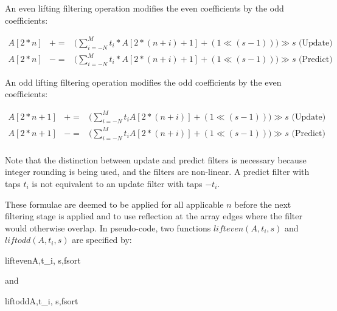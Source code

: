 An even lifting filtering operation modifies the even coefficients
by the odd coefficients:

\begin{eqnarray*}
  A[2*n]& +=& \big( \sum^M_{i=-N} t_i *A[2*(n+i) + 1] +(1\ll (s-1))\big) \gg s \mbox{ (Update)} \\
  A[2*n]& -=& \big( \sum^M_{i=-N} t_i *A[2*(n+i) + 1] +(1\ll (s-1))\big) \gg s \mbox{ (Predict)}
\end{eqnarray*}

An odd lifting filtering operation modifies the odd coefficients
 by the even coefficients:

\begin{eqnarray*}
  A[2*n+1]& +=&  \big( \sum^M_{i=-N} t_i A[2*(n+i)]+(1\ll (s-1)) \big) \gg s \mbox{ (Update)} \\
  A[2*n+1]& -=&  \big( \sum^M_{i=-N} t_i A[2*(n+i)] +(1\ll (s-1))\big) \gg s \mbox{ (Predict)} \\
\end{eqnarray*}

\begin{informative}
Note that the distinction between update and predict filters is necessary
because integer rounding is being used, and the filters are non-linear.
A predict filter with taps $t_i$ is not equivalent to an update filter with taps $-t_i$.
\end{informative}

These formulae are deemed to be applied for all applicable $n$
before the next filtering stage is applied and to use reflection at the array
edges where the filter would otherwise overlap. In pseudo-code, two
functions $lifteven(A, t_i, s)$ and $liftodd(A, t_i, s)$ are specified by:

\begin{pseudo}{lifteven}{A,t_i, s,fsort}
        \bsELSE
        \bsEND
    \bsEND
    \bsELSE
\bsEND
\end{pseudo}

and

\begin{pseudo}{liftodd}{A,t_i, s,fsort}
        \bsELSE
        \bsEND
    \bsEND
    \bsELSE
\bsEND\end{pseudo}


